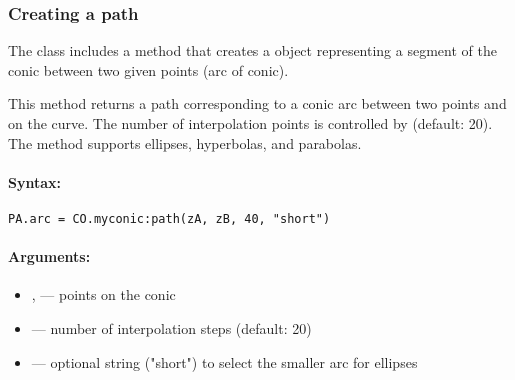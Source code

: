 \vspace{1em}


\begin{minipage}{.3\textwidth}
\end{minipage}
\begin{minipage}{.7\textwidth}
\begin{tkzexample}
\end{tkzexample}
\end{minipage}

\subsubsection{Creating a path}
\label{ssub:conic_path}

The  class includes a method  that creates a  object representing a segment of the conic between two given points (arc of conic).

This method returns a path corresponding to a conic arc between two points  and  on the curve. The number of interpolation points is controlled by  (default: 20). The method supports ellipses, hyperbolas, and parabolas.

\paragraph{Syntax:}
\begin{verbatim}
PA.arc = CO.myconic:path(zA, zB, 40, "short")
\end{verbatim}

\paragraph{Arguments:}
\begin{itemize}
\item {},  — points on the conic
\item {} — number of interpolation steps (default: 20)
\item {} — optional string ("short") to select the smaller arc for ellipses
\end{itemize}

